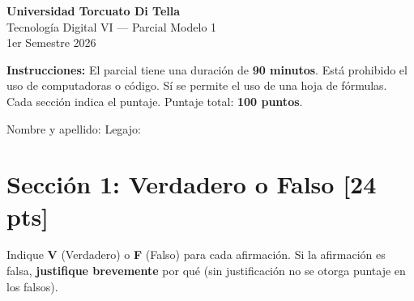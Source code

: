 \documentclass[11pt,a4paper]{article}
\newcommand{\puntaje}[1]{\textbf{[#1 pts]}}
\begin{document}
\begin{center}
  {\Large\bfseries Universidad Torcuato Di Tella}\\[4pt]
  {\large Tecnolog\'ia Digital VI --- Parcial Modelo 1}\\[2pt]
  {\normalsize 1er Semestre 2026}\\[8pt]
\end{center}

\begin{infobox}
\textbf{Instrucciones:} El parcial tiene una duraci\'on de \textbf{90 minutos}. Est\'a prohibido el uso de computadoras o c\'odigo. S\'i se permite el uso de una hoja de f\'ormulas. Cada secci\'on indica el puntaje. Puntaje total: \textbf{100 puntos}.
\end{infobox}

\vspace{0.5cm}

Nombre y apellido: \underline{\hspace{8cm}} \hfill Legajo: \underline{\hspace{3cm}}

\vspace{0.8cm}

\section*{Secci\'on 1: Verdadero o Falso \puntaje{24}}

\noindent Indique \textbf{V} (Verdadero) o \textbf{F} (Falso) para cada afirmaci\'on. Si la afirmaci\'on es falsa, \textbf{justifique brevemente} por qu\'e (sin justificaci\'on no se otorga puntaje en los falsos).

\vspace{0.3cm}
\end{document}
